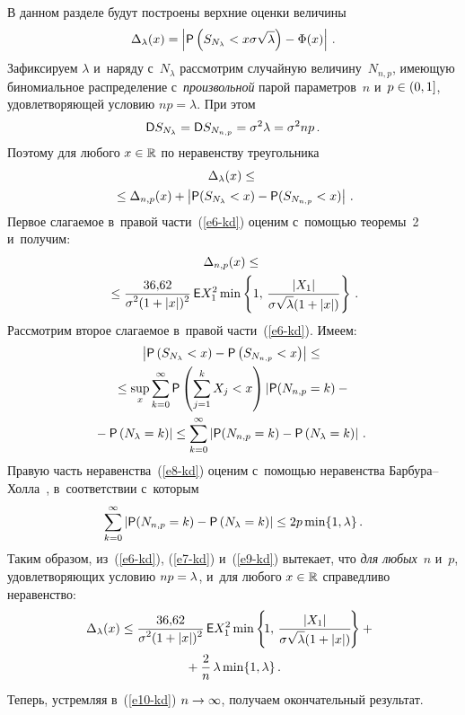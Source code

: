 \begin{multicols}{2}
В данном разделе будут построены верхние оценки величины
$$
\Delta_{\lambda}(x)=\left\vert {\sf P}\left(S_{N_{\lambda}}<x\sigma
\sqrt{\lambda}\right)-\Phi(x)\right\vert\,.
$$
Зафиксируем $\lambda$ и~наряду с~$N_{\lambda}$ рассмотрим случайную
величину~$N_{n,p}$, имеющую биномиальное распределение с~\textit{произвольной} 
парой параметров~$n$ и~$p\hm\in(0,1]$, удовлетворяющей
условию $np=\lambda$. При этом
$$
{\sf D}S_{N_{\lambda}}={\sf D}S_{N_{n,p}}=\sigma^2\lambda=\sigma^2np\,.
$$
Поэтому для любого $x\hm\in\mathbb{R}$ по неравенству треугольника
\begin{multline}
\Delta_{\lambda}(x)\le{}\\
{}\le\Delta_{n,p}(x)+
\left\vert {\sf P}(S_{N_{\lambda}}<x)-{\sf P}(S_{N_{n,p}}<x)\right\vert\,.
\label{e6-kd}
\end{multline}
Первое слагаемое в~правой части~(\ref{e6-kd}) оценим с~помощью теоремы~2 и~получим:
\begin{multline}
\Delta_{n,p}(x)\le{}\\
{}\le \displaystyle\frac{\displaystyle 36{,}62\mathstrut}{\displaystyle \sigma^2(1+|x|)^2\mathstrut}\, {\sf E}X_1^2\min
\left\{1,\,\displaystyle\frac{\displaystyle |X_1|\mathstrut}{\displaystyle \sigma\sqrt{\lambda}(1+|x|)\mathstrut}\right\}\,.
\label{e7-kd}
\end{multline}
Рассмотрим второе слагаемое в~правой части~(\ref{e6-kd}). Имеем:
\begin{multline}
\left\vert {\sf P}\left(S_{N_{\lambda}}<x\right)-{\sf P}
\left(S_{N_{n,p}}<x\right)\right\vert \le{}\\
{}\le\sup\limits_x
\sum\limits_{k=0}^{\infty}{\sf P}
\left(\sum\limits_{j=1}^kX_j<x\right)\left\vert 
{\sf P}(N_{n,p}=k)-{}\right.\\
\hspace*{-4.5mm}\left.{}-{\sf P}\left(N_{\lambda}=k\right)\right\vert \le
\sum\limits_{k=0}^{\infty}\left\vert {\sf P}(N_{n,p}=k)-{\sf P}
\left(N_{\lambda}=k\right)\right\vert\,.\!\!\!\!
\label{e8-kd}
\end{multline}
Правую часть неравенства~(\ref{e8-kd}) оценим с~помощью неравенства
Бар\-бу\-ра--Хол\-ла~\cite{BarbourHallPoisson}, в~соответствии с~которым
\begin{equation}
\sum\limits_{k=0}^{\infty}\left\vert {\sf P}(N_{n,p}=k)-{\sf P}
\left(N_{\lambda}=k\right)\right\vert \le 2p\min\{1,\lambda\}\,.
\label{e9-kd}
\end{equation}
Таким образом, из~(\ref{e6-kd}), (\ref{e7-kd}) и~(\ref{e9-kd}) 
вытекает, что \textit{для любых}~$n$ и~$p$, 
удовлетворяющих условию $np\hm=\lambda$, и~для любого
$x\hm\in\mathbb{R}$ справедливо неравенство:
\begin{multline}
\hspace*{-1.5mm}\Delta_{\lambda}(x)\le \displaystyle\frac{\displaystyle 36{,}62\mathstrut}{\displaystyle \sigma^2(1+|x|)^2\mathstrut}\, {\sf E}
X_1^2\min\left\{\!1,\,\displaystyle\frac{\displaystyle |X_1|\mathstrut}{\displaystyle \sigma\sqrt{\lambda}(1+|x|)\mathstrut}\!\right\} +{}\hspace*{-0.44373pt}\\
{}+
\displaystyle\frac{\displaystyle 2\mathstrut}{\displaystyle n\mathstrut}\,\lambda\min\{1,\lambda\}\,.
\label{e10-kd}
\end{multline}
Теперь, устремляя в~(\ref{e10-kd}) $n\hm\to\infty$, получаем окончательный
результат.


\end{multicols}
